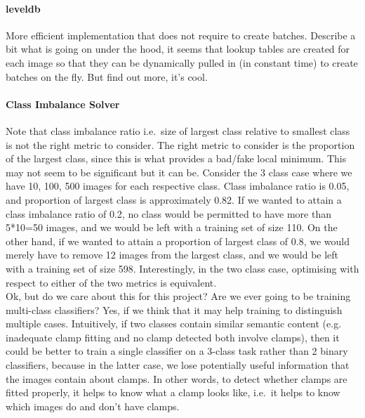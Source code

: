 \documentclass[a4paper,11pt]{article}
\begin{document}
\paragraph{leveldb}

More efficient implementation that does not require to create batches. Describe a bit what is going on under the hood, it seems that lookup tables are created for each image so that they can be dynamically pulled in (in constant time) to create batches on the fly. But find out more, it's cool. \\

\paragraph{Class Imbalance Solver}

Note that class imbalance ratio i.e.\ size of largest class relative to smallest class is not the right metric to consider. The right metric to consider is the proportion of the largest class, since this is what provides a bad/fake local minimum. This may not seem to be significant but it can be. Consider the 3 class case where we have 10, 100, 500 images for each respective class. Class imbalance ratio is 0.05, and proportion of largest class is approximately 0.82. If we wanted to attain a class imbalance ratio of 0.2, no class would be permitted to have more than 5*10=50 images, and we would be left with a training set of size 110. On the other hand, if we wanted to attain a proportion of largest class of 0.8, we would merely have to remove 12 images from the largest class, and we would be left with a training set of size 598. Interestingly, in the two class case, optimising with respect to either of the two metrics is equivalent. \\

Ok, but do we care about this for this project? Are we ever going to be training multi-class classifiers? Yes, if we think that it may help training to distinguish multiple cases. Intuitively, if two classes contain similar semantic content (e.g. inadequate clamp fitting and no clamp detected both involve clamps), then it could be better to train a single classifier on a 3-class task rather than 2 binary classifiers, because in the latter case, we lose potentially useful information that the images contain about clamps. In other words, to detect whether clamps are fitted properly, it helps to know what a clamp looks like, i.e.\ it helps to know which images do and don't have clamps. \\
\end{document}
